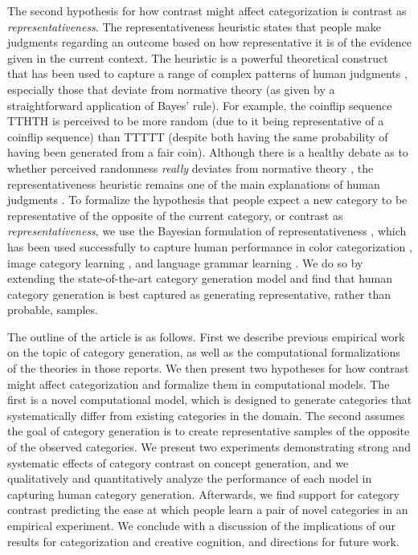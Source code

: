 \documentclass[12pt]{article}
\begin{document}
\begin{flushleft}
The second hypothesis for how contrast might affect categorization is contrast
as {\em representativeness}. The representativeness heuristic \citep{kahneman1972subjective}
states that people make judgments regarding an outcome based on how
representative it is of the evidence given in the current context. The heuristic
is a powerful theoretical construct that has been used to capture a range of
complex patterns of human judgments \citep{kahneman73,tversky74,tversky83},
especially those that deviate from normative theory (as given by a
straightforward application of Bayes' rule). For example, the coinflip sequence
TTHTH is perceived to be more random (due to it being representative of a
coinflip sequence) than TTTTT (despite both having the same probability of
having been generated from a fair coin). Although there is a healthy debate as
to whether perceived randomness {\em really} deviates from normative theory
\citep{griffiths18,hahn09}, the representativeness heuristic remains one of the
main explanations of human judgments \citep{reimers18}. To formalize the
hypothesis that people expect a new category to be representative of the
opposite of the current category, or contrast as {\em representativeness}, we
use the Bayesian formulation of representativeness \citep{tenenbaum01}, which
has been used successfully to capture human performance in color categorization
\citep{abbott16}, image category learning \citep{abbott11}, and language grammar
learning \citep{rafferty10}. We do so by extending the state-of-the-art category
generation model \citep{jern2013probabilistic} and find that human category
generation is best captured as generating representative, rather than probable,
samples.

The outline of the article is as follows. First we describe previous empirical
work on the topic of category generation, as well as the computational
formalizations of the theories in those reports. We then present two hypotheses
for how contrast might affect categorization and formalize them in computational
models. The first is a novel computational model, which is designed to generate
categories that systematically differ from existing categories in the domain.
The second assumes the goal of category generation is to create representative
samples of the opposite of the observed categories. We present two experiments
demonstrating strong and systematic effects of category contrast on concept
generation, and we qualitatively and quantitatively analyze the performance of
each model in capturing human category generation. Afterwards, we find support
for category contrast predicting the ease at which people learn a pair of novel
categories in an empirical experiment. We conclude with a discussion of the
implications of our results for categorization and creative cognition, and
directions for future work.


\end{flushleft}
\end{document}

